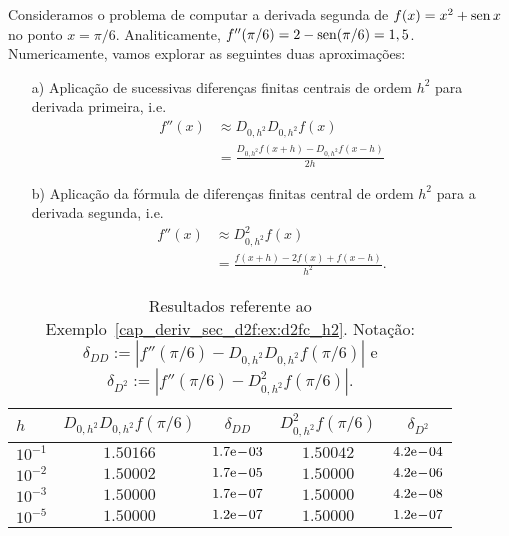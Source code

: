 \begin{ex}\label{cap_deriv_sec_d2f:ex:d2fc_h2}
  Consideramos o problema de computar a derivada segunda de $f(x) = x^2 + \operatorname{sen} x$ no ponto $x=\pi/6$. Analiticamente, $f''(\pi/6) = 2 - \operatorname{sen}(\pi/6) = 1,5$. Numericamente, vamos explorar as seguintes duas aproximações:
  \begin{enumerate}
  \item[a)] Aplicação de sucessivas diferenças finitas centrais de ordem $h^2$ para derivada primeira, i.e.
    \begin{subequations}\label{cap_deriv_sec_d2f:eq:ddf}
      \begin{align}
        f''(x) &\approx D_{0,h^2}D_{0,h^2}f(x) \\
               &= \frac{D_{0,h^2}f(x+h) - D_{0,h^2}f(x-h)}{2h}
      \end{align}
    \end{subequations}
  \item[b)] Aplicação da fórmula de diferenças finitas central de ordem $h^2$ para a derivada segunda, i.e.
    \begin{subequations}
      \begin{align}
        f''(x) &\approx D_{0,h^2}^2 f(x)\\
               &= \frac{f(x+h) - 2f(x) + f(x-h)}{h^2}.
      \end{align}
    \end{subequations}
  \end{enumerate}

\begin{table}[h!]
  \centering
  \caption{Resultados referente ao Exemplo~\ref{cap_deriv_sec_d2f:ex:d2fc_h2}. Notação: $\delta_{DD}:=|f''(\pi/6)-D_{0,h^2}D_{0,h^2}f(\pi/6)|$ e $\delta_{D^2}:=|f''(\pi/6)-D^2_{0,h^2}f(\pi/6)|$.}
  \begin{tabular}{l|cc|cc}
    $h$ & $D_{0,h^2}D_{0,h^2}f(\pi/6)$ & $\delta_{DD}$ & $D^2_{0,h^2}f(\pi/6)$ & $\delta_{D^2}$ \\ \hline
    $10^{-1}$ &  $1.50166$ & $1.7\mathrm{e}\!-\!03$ & $1.50042$ & $4.2\mathrm{e}\!-\!04$ \\
    $10^{-2}$ &  $1.50002$ & $1.7\mathrm{e}\!-\!05$ & $1.50000$ & $4.2\mathrm{e}\!-\!06$ \\
    $10^{-3}$ &  $1.50000$ & $1.7\mathrm{e}\!-\!07$ & $1.50000$ & $4.2\mathrm{e}\!-\!08$ \\
    $10^{-5}$ &  $1.50000$ & $1.2\mathrm{e}\!-\!07$ & $1.50000$ & $1.2\mathrm{e}\!-\!07$ \\\hline
  \end{tabular}
  \label{cap_deriv_sec_d2f:tab:ex_d2fc_h2}
\end{table}


\end{ex}

